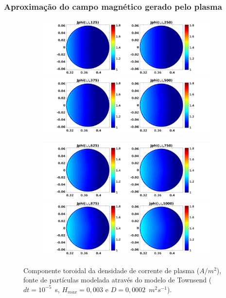 \begin{frame}		
\frametitle{ Aproximação do campo magnético gerado pelo plasma}
\begin{figure}[H]
\begin{subfigure}{0.43\textwidth}
\includegraphics[scale=0.24]{../SImulacao_breakdown/PDE/Jphitod1B9.png}  
\includegraphics[scale=0.24]{../SImulacao_breakdown/PDE/Jphitod2B9.png}
\end{subfigure}
\begin{subfigure}{0.43\textwidth}
\includegraphics[scale=0.24]{../SImulacao_breakdown/PDE/Jphitod3B9.png} 
\includegraphics[scale=0.24]{../SImulacao_breakdown/PDE/Jphitod4B9.png} 
\end{subfigure}
\caption{Componente toroidal da densidade de corrente de plasma ($A/m^2$), fonte de partículas modelada através do modelo de Townsend ($dt=10^{-5}$\ s, $H_{max} = 0,003$ e $D=0,0002$\ $m^2s^{-1}$).}
\label{campplasmasil2}
\end{figure}
\end{frame}


